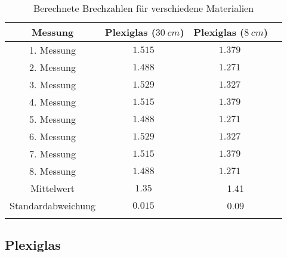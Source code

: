 \begin{table}[H]
    \begin{center}
        \caption{Berechnete Brechzahlen für verschiedene Materialien}
        \begin{tabular}{cccc}
            \hline
            Messung            & Plexiglas ($\SI{30}{cm}$) & Plexiglas ($\SI{8}{cm}$)  \\
            \hline
            1. Messung         & $\SI{1,515}{}$            & $\SI{1,379}{}$ \\
            2. Messung         & $\SI{1,488}{}$            & $\SI{1,271}{}$ \\
            3. Messung         & $\SI{1,529}{}$            & $\SI{1,327}{}$ \\
            4. Messung         & $\SI{1,515}{}$            & $\SI{1,379}{}$ \\
            5. Messung         & $\SI{1,488}{}$            & $\SI{1,271}{}$ \\
            6. Messung         & $\SI{1,529}{}$            & $\SI{1,327}{}$ \\
            7. Messung         & $\SI{1,515}{}$            & $\SI{1,379}{}$ \\
            8. Messung         & $\SI{1,488}{}$            & $\SI{1,271}{}$ \\
            \hline
            Mittelwert         & $\SI{1,35}{}$        & \multicolumn{2}{c}{\SI{1,41}{}} \\
            Standardabweichung & $\SI{0,015}{}$       & \multicolumn{2}{c}{\SI{0,09}{}} \\
            \hline
            \label{tab:Ergebnisse-Brechzahlen}
        \end{tabular}
    \end{center}
\end{table}


\subsection{Plexiglas}

